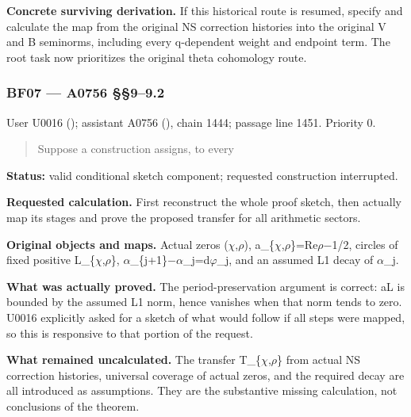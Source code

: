\textbf{Concrete surviving derivation.} If this historical route is
resumed, specify and calculate the map from the original NS correction
histories into the original V and B seminorms, including every
q-dependent weight and endpoint term. The root task now prioritizes the
original theta cohomology route.

\subsubsection{BF07 --- A0756 §§9--9.2}\label{TranscriptLedgerStage:bf07-a0756-99.2}

User U0016 (\protect{});
assistant A0756 (\protect{}),
chain 1444; passage line 1451. Priority 0.

\begin{quote}
Suppose a construction assigns, to every
\end{quote}

\textbf{Status:} valid conditional sketch component; requested
construction interrupted.

\textbf{Requested calculation.} First reconstruct the whole proof
sketch, then actually map its stages and prove the proposed transfer for
all arithmetic sectors.

\textbf{Original objects and maps.} Actual zeros
(\allowbreak{}\ensuremath{χ}\allowbreak{},\allowbreak{}\ensuremath{ρ}\allowbreak{}),
a\_\{\allowbreak{}\ensuremath{χ}\allowbreak{},\allowbreak{}\ensuremath{ρ}\allowbreak{}\}=Re\allowbreak{}\ensuremath{ρ}\allowbreak{}\allowbreak{}\ensuremath{−}\allowbreak{}1/2,
circles of fixed positive
L\_\{\allowbreak{}\ensuremath{χ}\allowbreak{},\allowbreak{}\ensuremath{ρ}\allowbreak{}\},
\allowbreak{}\ensuremath{α}\allowbreak{}\_\{j+1\}\allowbreak{}\ensuremath{−}\allowbreak{}\allowbreak{}\ensuremath{α}\allowbreak{}\_j=d\allowbreak{}\ensuremath{φ}\allowbreak{}\_j,
and an assumed L1 decay of \allowbreak{}\ensuremath{α}\allowbreak{}\_j.

\textbf{What was actually proved.} The period-preservation argument is
correct: \textbar a\textbar L is bounded by the assumed L1 norm, hence
vanishes when that norm tends to zero. U0016 explicitly asked for a
sketch of what would follow if all steps were mapped, so this is
responsive to that portion of the request.

\textbf{What remained uncalculated.} The transfer
T\_\{\allowbreak{}\ensuremath{χ}\allowbreak{},\allowbreak{}\ensuremath{ρ}\allowbreak{}\}
from actual NS correction histories, universal coverage of actual zeros,
and the required decay are all introduced as assumptions. They are the
substantive missing calculation, not conclusions of the theorem.

